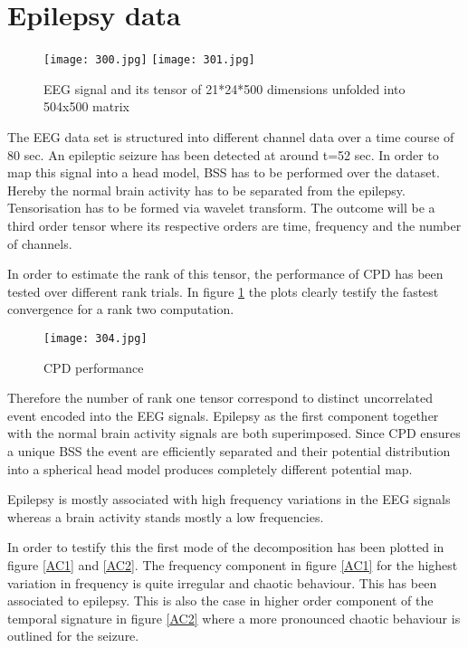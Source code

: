 \section{Epilepsy data}


\begin{figure}[!htbp]
%
\centering
\texttt{[image: 300.jpg]}
\endminipage\hfill
{}%
\centering
\texttt{[image: 301.jpg]}
\endminipage\hfill
\caption{EEG signal and its tensor of 21*24*500 dimensions unfolded into  504x500 matrix}
\end{figure}

The EEG data set is structured into different channel data over a time course of 80 sec. An epileptic seizure has been detected at around t=52 sec. In order to map this signal into a head model, BSS has to be performed over the dataset. Hereby the normal brain activity has to be separated from the epilepsy. Tensorisation has to be formed via wavelet transform. The outcome will be a third order tensor where its respective orders are time, frequency and the number of channels. 

In order to estimate the rank of this tensor, the performance of CPD has been tested over different rank trials. In figure \ref{CPD-4} the plots clearly testify the fastest convergence for a rank two computation. 

\begin{figure}[!htbp]
\centering
\texttt{[image: 304.jpg]}
\caption{CPD performance}\label{CPD-4}
\end{figure}


Therefore the number of rank one tensor correspond to distinct uncorrelated event encoded into the EEG signals. Epilepsy as the first component together with the normal brain activity signals are both superimposed. Since CPD ensures a unique BSS the event are efficiently separated and their potential distribution into a spherical head model produces completely different potential map. 

Epilepsy is mostly associated with high frequency variations in the EEG signals whereas a brain activity stands mostly a low frequencies. 

In order to testify this the first mode of the decomposition has been plotted in figure \ref{AC1} and \ref{AC2}. The frequency component in figure \ref{AC1} for the highest variation in frequency is quite irregular and chaotic behaviour. This has been associated to epilepsy. This is also the case in higher order component of the temporal signature in figure \ref{AC2} where a more pronounced chaotic behaviour is outlined for the seizure.



